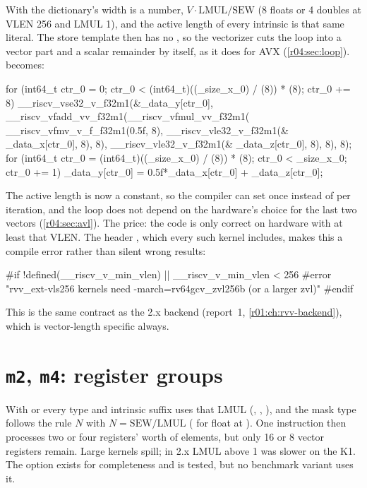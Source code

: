 With  the dictionary's width is a number, $V\cdot\text{LMUL}/\text{SEW}$
(8 floats or 4 doubles at VLEN 256 and LMUL 1), and the active length of every
intrinsic is that same literal. The store template then has no , so
the vectorizer cuts the loop into a vector part and a scalar remainder by itself, as it
does for AVX (\cref{r04:sec:loop}).  becomes:
\begin{ccode}
for (int64_t ctr_0 = 0; ctr_0 < (int64_t)((_size_x_0) / (8)) * (8); ctr_0 += 8)
{
   __riscv_vse32_v_f32m1(&_data_y[ctr_0], __riscv_vfadd_vv_f32m1(__riscv_vfmul_vv_f32m1(
      __riscv_vfmv_v_f_f32m1(0.5f, 8), __riscv_vle32_v_f32m1(& _data_x[ctr_0], 8), 8),
      __riscv_vle32_v_f32m1(& _data_z[ctr_0], 8), 8), 8);
}
for (int64_t ctr_0 = (int64_t)((_size_x_0) / (8)) * (8); ctr_0 < _size_x_0; ctr_0 += 1)
{
   _data_y[ctr_0] = 0.5f*_data_x[ctr_0] + _data_z[ctr_0];
}
\end{ccode}
The active length is now a constant, so the compiler can set  once instead of
per iteration, and the loop does not depend on the hardware's choice for the last two
vectors (\cref{r04:sec:avl}). The price: the code is only correct on hardware with at
least that VLEN. The header , which every such kernel
includes, makes this a compile error rather than silent wrong results:
\begin{ccode}
#if !defined(__riscv_v_min_vlen) || __riscv_v_min_vlen < 256
#error "rvv_ext-vls256 kernels need -march=rv64gcv_zvl256b (or a larger zvl)"
#endif
\end{ccode}
This is the same contract as the 2.x backend (report~1, \cref{r01:ch:rvv-backend}),
which is vector-length specific always.

\section{\texttt{m2}, \texttt{m4}: register groups}\label{r04:sec:ext-lmul}

With  or  every type and intrinsic suffix uses that LMUL
(, , ),
and the mask type follows the rule $N$ with $N = \text{SEW}/\text{LMUL}$
( for float at ). One instruction then processes two or four
registers' worth of elements, but only 16 or 8 vector registers remain. Large kernels
spill; in 2.x LMUL above 1 was slower on the K1. The option exists for completeness and
is tested, but no benchmark variant uses it.

